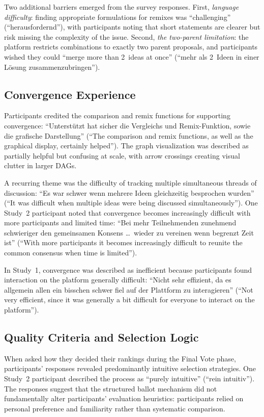 \documentclass[a4paper, 12pt, twoside]{iviathesis}
\begin{document}
Two additional barriers emerged from the survey responses. First, \textit{language difficulty}: finding appropriate formulations for remixes was ``challenging'' (``herausfordernd''), with participants noting that short statements are clearer but risk missing the complexity of the issue. Second, \textit{the two-parent limitation}: the platform restricts combinations to exactly two parent proposals, and participants wished they could ``merge more than 2~ideas at once'' (``mehr als 2~Ideen in einer L\"osung zusammenzubringen'').

\subsection{Convergence Experience}

Participants credited the comparison and remix functions for supporting convergence: ``Unterst\"utzt hat sicher die Vergleichs und Remix-Funktion, sowie die grafische Darstellung'' (``The comparison and remix functions, as well as the graphical display, certainly helped''). The graph visualization was described as partially helpful but confusing at scale, with arrow crossings creating visual clutter in larger DAGs.

A recurring theme was the difficulty of tracking multiple simultaneous threads of discussion: ``Es war schwer wenn mehrere Ideen gleichzeitig besprochen wurden'' (``It was difficult when multiple ideas were being discussed simultaneously''). One Study~2 participant noted that convergence becomes increasingly difficult with more participants and limited time: ``Bei mehr Teilnehmenden zunehmend schwieriger den gemeinsamen Konsens \ldots\ wieder zu vereinen wenn begrenzt Zeit ist'' (``With more participants it becomes increasingly difficult to reunite the common consensus when time is limited'').

In Study~1, convergence was described as inefficient because participants found interaction on the platform generally difficult: ``Nicht sehr effizient, da es allgemein allen ein bisschen schwer fiel auf der Plattform zu interagieren'' (``Not very efficient, since it was generally a bit difficult for everyone to interact on the platform'').

\subsection{Quality Criteria and Selection Logic}

When asked how they decided their rankings during the Final Vote phase, participants' responses revealed predominantly intuitive selection strategies. One Study~2 participant described the process as ``purely intuitive'' (``rein intuitiv''). The responses suggest that the structured ballot mechanism did not fundamentally alter participants' evaluation heuristics: participants relied on personal preference and familiarity rather than systematic comparison.
\end{document}
